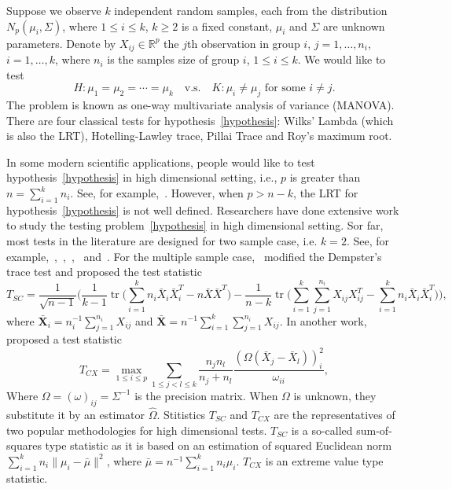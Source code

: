 \documentclass[review]{elsarticle}
\DeclareMathOperator{\mytr}{tr}
\newcommand{\bX}{\mathbf{X}}
\theoremstyle{plain}
\theoremstyle{definition}
\theoremstyle{remark}
\begin{document}
Suppose we observe $k$ independent random samples, each from the distribution $N_p(\mu_i,\Sigma)$, where $1\leq i\leq k$, $k\geq 2$ is a fixed constant, $\mu_i$ and $\Sigma$ are unknown parameters.
Denote by $X_{ij}\in \mathbb{R}^p$ the $j$th observation in group $i$, $j=1,\ldots,n_i$, $i=1,\ldots, k$,  where $n_i$ is the samples size of group $i$, $1\leq i \leq k$.
We would like to test
\begin{equation}\label{hypothesis}
    H: \mu_1=\mu_2=\cdots=\mu_k\quad \text{v.s.}\quad K: \text{$\mu_i\neq \mu_j$ for some $i\neq j$}.
\end{equation}
The problem is known as one-way multivariate analysis of variance (MANOVA).
There are four classical tests for hypothesis~\eqref{hypothesis}: Wilks' Lambda (which is also the LRT), Hotelling-Lawley trace, Pillai Trace and Roy's maximum root.


In some modern scientific applications, people would like to test hypothesis~\eqref{hypothesis} in high dimensional setting, i.e., $p$ is greater than $n=\sum_{i=1}^{k}n_i$. See, for example,~\cite{Tsai2009}.
However, when $p>n-k$, the LRT for hypothesis~\eqref{hypothesis} is not well defined.
  Researchers have done extensive work to study the testing problem~\eqref{hypothesis} in high dimensional setting.
 Sor far, most tests in the literature are designed for two sample case, i.e. $k=2$.
  See, for example,~\cite{Bai1996Efiect},~\cite{Chen2010A},~\cite{Srivastava2009A},~\cite{Feng2015Multivariate} and~\cite{Tony2013}.
  For the multiple sample case,~\cite{Schott2007Some} modified the Dempster's trace test and proposed the test statistic
  $$
  T_{SC}=\frac{1}{\sqrt{n-1}}\big(
  \frac{1}{k-1}\mytr\big(\sum_{i=1}^k n_i\bar{X}_i\bar{X}_i^T-n\bar{X}\bar{X}^T\big)-\frac{1}{n-k}\mytr\big(\sum_{i=1}^k \sum_{j=1}^{n_i}X_{ij}X_{ij}^T-\sum_{i=1}^k n_i\bar{X}_i\bar{X}_i^T\big)
  \big),
  $$
  where $\bar{\bX}_i=n_i^{-1}\sum_{j=1}^{n_i}X_{ij}$ and $\bar{\bX}=n^{-1}\sum_{i=1}^k\sum_{j=1}^{n_i}X_{ij}$.
  In another work,~\cite{Cai2014High} proposed a test statistic
  $$
  T_{CX}=\max_{1\leq i\leq p} \sum_{1\leq j<l\leq k}\frac{n_j n_l}{n_j+n_l}\frac{(\Omega(\bar{X}_j-\bar{X}_l))_i^2}{\omega_{ii}},
  $$
  Where $\Omega=(\omega)_{ij}=\Sigma^{-1}$ is the precision matrix. When $\Omega$ is unknown, they substitute it by an estimator $\hat{\Omega}$.
  Stitistics $T_{SC}$ and $T_{CX}$ are the representatives of two popular methodologies for high dimensional tests.
  $T_{SC}$ is a so-called sum-of-squares type statistic as it is based on an estimation of squared Euclidean norm $\sum_{i=1}^k n_i\|\mu_i-\bar{\mu}\|^2$, where $\bar{\mu}=n^{-1}\sum_{i=1}^k n_i \mu_i$.
  $T_{CX}$ is an extreme value type statistic.
  
\end{document}
